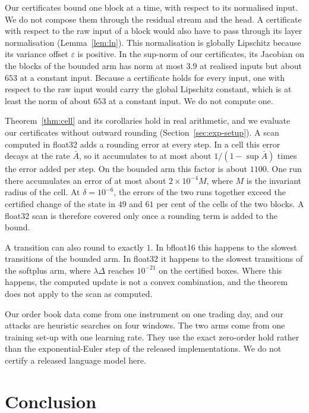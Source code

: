 \documentclass[11pt, a4paper]{article}
\theoremstyle{remark}
\theoremstyle{plain}
\newcommand{\Abar}{\bar{A}}
\begin{document}
Our certificates bound one block at a time, with respect to its normalised input. We do not compose
them through the residual stream and the head. A certificate with respect to the raw input of a
block would also have to pass through its layer normalisation (Lemma~\ref{lem:ln}). This
normalisation is globally Lipschitz because its variance offset $\varepsilon$ is positive. In the
sup-norm of our certificates, its Jacobian on the blocks of the bounded arm has norm at most $3.9$
at realised inputs but about $653$ at a constant input. Because a certificate holds for every
input, one with respect to the raw input would carry the global Lipschitz constant, which is at
least the norm of about $653$ at a constant input. We do not compute one.

Theorem~\ref{thm:cell} and its corollaries hold in real arithmetic, and we evaluate our
certificates without outward rounding (Section~\ref{sec:exp-setup}). A scan computed in float32
adds a rounding error at every step. In a cell this error decays at the rate $\Abar$, so it
accumulates to at most about $1/(1 - \sup\Abar)$ times the error added per step. On the bounded
arm this factor is about $1100$. One run there accumulates an error of at most about
$2 \times 10^{-4} M$, where $M$ is the invariant radius of the cell. At $\delta = 10^{-6}$, the
errors of the two runs together exceed the certified change of the state in $49$ and $61$ per cent
of the cells of the two blocks. A float32 scan is therefore
covered only once a rounding term is added to the bound.

A transition can also round to exactly $1$. In bfloat16 this happens to the slowest transitions of
the bounded arm. In float32 it happens to the slowest transitions of the softplus arm, where
$\lambda\Delta$ reaches $10^{-21}$ on the certified boxes. Where this happens, the computed update
is not a convex combination, and the theorem does not apply to the scan as computed.

Our order book data come from one instrument on one trading day, and our attacks are heuristic
searches on four windows. The two arms come from one training set-up with one learning rate. They
use the exact zero-order hold rather than the exponential-Euler step of the released
implementations. We do not certify a released language model here.

\section{Conclusion}
\label{sec:conclusion}
\end{document}

